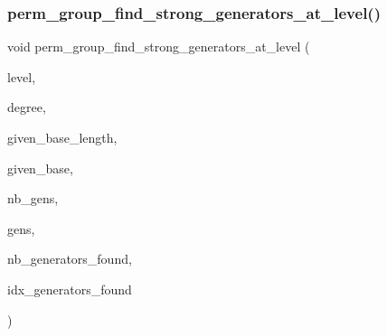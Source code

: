 \subsubsection{\texorpdfstring{perm\+\_\+group\+\_\+find\+\_\+strong\+\_\+generators\+\_\+at\+\_\+level()}{perm\_group\_find\_strong\_generators\_at\_level()}}
{\footnotesize\ttfamily void perm\+\_\+group\+\_\+find\+\_\+strong\+\_\+generators\+\_\+at\+\_\+level (\begin{DoxyParamCaption}\item[{\mbox{\hyperlink{galois_8h_a09fddde158a3a20bd2dcadb609de11dc}{I\+NT}}}]{level,  }\item[{\mbox{\hyperlink{galois_8h_a09fddde158a3a20bd2dcadb609de11dc}{I\+NT}}}]{degree,  }\item[{\mbox{\hyperlink{galois_8h_a09fddde158a3a20bd2dcadb609de11dc}{I\+NT}}}]{given\+\_\+base\+\_\+length,  }\item[{\mbox{\hyperlink{galois_8h_a09fddde158a3a20bd2dcadb609de11dc}{I\+NT}} $\ast$}]{given\+\_\+base,  }\item[{\mbox{\hyperlink{galois_8h_a09fddde158a3a20bd2dcadb609de11dc}{I\+NT}}}]{nb\+\_\+gens,  }\item[{\mbox{\hyperlink{galois_8h_a09fddde158a3a20bd2dcadb609de11dc}{I\+NT}} $\ast$}]{gens,  }\item[{\mbox{\hyperlink{galois_8h_a09fddde158a3a20bd2dcadb609de11dc}{I\+NT}} \&}]{nb\+\_\+generators\+\_\+found,  }\item[{\mbox{\hyperlink{galois_8h_a09fddde158a3a20bd2dcadb609de11dc}{I\+NT}} $\ast$}]{idx\+\_\+generators\+\_\+found }\end{DoxyParamCaption})}

\mbox{\label{perm__group_8_c_a9dfc946f0643db978d4d719964f1ded2}} 

